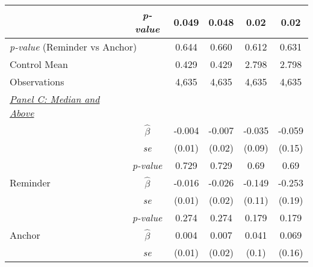 \begin{tabular}{cccccc}
\multicolumn{1}{l}{} & \multicolumn{1}{c}{\scriptsize{\textit{p-value}}} & \multicolumn{1}{c}{0.049} & \multicolumn{1}{c}{0.048} & \multicolumn{1}{c}{0.02} & \multicolumn{1}{c}{0.02} \\
\midrule
\multicolumn{2}{l}{\textit{p-value} (Reminder vs Anchor)}& \multicolumn{1}{c}{0.644}& \multicolumn{1}{c}{0.660}& \multicolumn{1}{c}{0.612}& \multicolumn{1}{c}{0.631}\\
\multicolumn{2}{l}{Control Mean} &0.429&0.429&2.798&2.798\\
\multicolumn{2}{l}{Observations} &4,635&4,635&4,635&4,635\\
\midrule
\multicolumn{1}{l}{\underline{\textit{Panel C: Median and Above}}} &  &  &  & &\\ 
 \addlinespace
\multicolumn{1}{l}{Any Treatment} & \multicolumn{1}{c}{\scriptsize $\hat{\beta}$} & \multicolumn{1}{c}{-0.004} & \multicolumn{1}{c}{-0.007} & \multicolumn{1}{c}{-0.035} & \multicolumn{1}{c}{-0.059} \\
\multicolumn{1}{l}{} & \multicolumn{1}{c}{\scriptsize{\textit{se}}} & \multicolumn{1}{c}{(0.01)} & \multicolumn{1}{c}{(0.02)} & \multicolumn{1}{c}{(0.09)} & \multicolumn{1}{c}{(0.15)} \\
\multicolumn{1}{l}{} & \multicolumn{1}{c}{\scriptsize{\textit{p-value}}} & \multicolumn{1}{c}{0.729} & \multicolumn{1}{c}{0.729} & \multicolumn{1}{c}{0.69} & \multicolumn{1}{c}{0.69} \\
\multicolumn{1}{l}{Reminder} & \multicolumn{1}{c}{\scriptsize $\hat{\beta}$} & \multicolumn{1}{c}{-0.016} & \multicolumn{1}{c}{-0.026} & \multicolumn{1}{c}{-0.149} & \multicolumn{1}{c}{-0.253} \\
\multicolumn{1}{l}{} & \multicolumn{1}{c}{\scriptsize{\textit{se}}} & \multicolumn{1}{c}{(0.01)} & \multicolumn{1}{c}{(0.02)} & \multicolumn{1}{c}{(0.11)} & \multicolumn{1}{c}{(0.19)} \\
\multicolumn{1}{l}{} & \multicolumn{1}{c}{\scriptsize{\textit{p-value}}} & \multicolumn{1}{c}{0.274} & \multicolumn{1}{c}{0.274} & \multicolumn{1}{c}{0.179} & \multicolumn{1}{c}{0.179} \\
\multicolumn{1}{l}{Anchor} & \multicolumn{1}{c}{\scriptsize $\hat{\beta}$} & \multicolumn{1}{c}{0.004} & \multicolumn{1}{c}{0.007} & \multicolumn{1}{c}{0.041} & \multicolumn{1}{c}{0.069} \\
\multicolumn{1}{l}{} & \multicolumn{1}{c}{\scriptsize{\textit{se}}} & \multicolumn{1}{c}{(0.01)} & \multicolumn{1}{c}{(0.02)} & \multicolumn{1}{c}{(0.1)} & \multicolumn{1}{c}{(0.16)} \\

\end{tabular}
